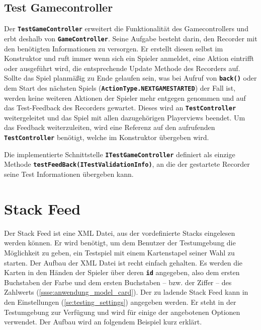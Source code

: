 \documentclass[
							a4paper, 
							11pt, 
							openany, 
							liststotoc,
							parskip=half, 
   							headings=normal
						]{scrreprt}
\begin{document}
{\subsection{Test Gamecontroller} \label{sse:testing_controller_game}
Der \textbf{\texttt{TestGameController}} erweitert die Funktionalität des Gamecontrollers und erbt deshalb von \textbf{\texttt{GameController}}. Seine Aufgabe besteht darin, den Recorder mit den be\-nö\-tig\-ten Informationen zu versorgen. Er erstellt diesen selbst im Konstruktor und ruft immer wenn sich ein Spieler anmeldet, eine Aktion eintrifft oder ausgeführt wird, die entsprechende Update Methode des Recorders auf.\newline
Sollte das Spiel planmäßig zu Ende gelaufen sein, was bei Aufruf von \textbf{\texttt{back()}} oder dem Start des nächsten Spiels (\textbf{\texttt{Ac\-ti\-on\-Ty\-pe.NEXT\-GA\-ME\-STAR\-TED}}) der Fall ist, werden keine weiteren Aktionen der Spieler mehr entgegen genommen und auf das Test-Feedback des Recorders gewartet.\newline
Dieses wird an \textbf{\texttt{TestController}} weitergeleitet und das Spiel mit allen da\-zu\-ge\-hö\-ri\-gen Playerviews beendet. Um das Feedback weiterzuleiten, wird eine Referenz auf den aufrufenden \textbf{\texttt{TestController}} benötigt, welche im Konstruktor übergeben wird.

Die implementierte Schnittstelle \textbf{\texttt{ITestGameController}} definiert als einzige Methode \textbf{\texttt{test\-Feed\-Back(ITest\-Va\-li\-da\-ti\-on\-In\-fo)}}, an die der gestartete Recorder seine Test Informationen übergeben kann.

\clearpage

\section{Stack Feed} \label{se:testing_stackfeed}
Der Stack Feed ist eine XML Datei, aus der vordefinierte Stacks eingelesen werden können. Er wird benötigt, um dem Benutzer der Testumgebung die Möglichkeit zu geben, ein Testspiel mit einem Kartenstapel seiner Wahl zu starten.\newline
Der Aufbau der XML Datei ist recht einfach gehalten. Es werden die Karten in den Händen der Spieler über deren \textbf{\texttt{id}} angegeben, also dem ersten Buchstaben der Farbe und dem ersten Buchstaben -- bzw. der Ziffer -- des Zahlwerts (\autoref{ssse:anwendung_model_card}).
Der zu ladende Stack Feed kann in den Einstellungen (\autoref{se:testing_settings}) angegeben werden. Er steht in der Testumgebung zur Verfügung und wird für einige der angebotenen Optionen verwendet.\newline
Der Aufbau wird an folgendem Beispiel kurz erklärt.\bigskip

}
\end{document}
